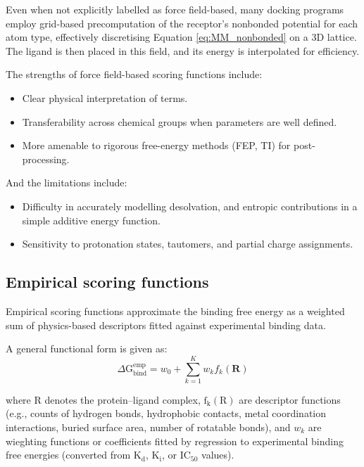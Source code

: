 \documentclass[12pt]{article}
\begin{document}
Even when not explicitly labelled as force field-based, many docking programs employ grid-based precomputation of the receptor's nonbonded potential for each atom type, effectively discretising Equation \ref{eq:MM_nonbonded} on a 3D lattice. The ligand is then placed in this field, and its energy is interpolated for efficiency.

The strengths of force field-based scoring functions include:
\begin{itemize}
    \item Clear physical interpretation of terms.
    \item Transferability across chemical groups when parameters are well defined.
    \item More amenable to rigorous free-energy methods (FEP, TI) for post-processing.
\end{itemize}

And the limitations include:
\begin{itemize}
    \item Difficulty in accurately modelling desolvation, and entropic contributions in a simple additive energy function.
    \item Sensitivity to protonation states, tautomers, and partial charge assignments.
\end{itemize}

\subsection{Empirical scoring functions}
Empirical scoring functions approximate the binding free energy as a weighted sum of physics-based descriptors fitted against experimental binding data. 

A general functional form is given as:
\begin{equation}
    \Delta \textrm{G}_{\text{bind}}^{\text{emp}} = w_0 + \sum_{k=1}^{K} w_k f_k(\mathbf{R})
\label{eq:empirical_general}
\end{equation}

where R denotes the protein--ligand complex, $\textrm{f}_\textrm{k}(\textrm{R})$ are descriptor functions (e.g., counts of hydrogen bonds, hydrophobic contacts, metal coordination interactions, buried surface area, number of rotatable bonds), and $w_k$ are wieghting functions or coefficients fitted by regression to experimental binding free energies (converted from $\textrm{K}_\textrm{d}$, $\textrm{K}_\textrm{i}$, or IC$_{\textrm{50}}$ values)\cite{CH3_Wang2017}.
\end{document}
